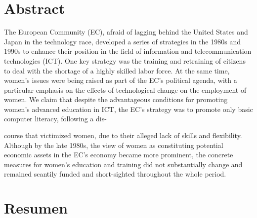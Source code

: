 \documentclass{tufte-handout}
\begin{document}
\begin{titlepage}
\begin{fullwidth}
\end{fullwidth}

\vspace*{1em}


\hypertarget{abstract}{%
\section{Abstract}\label{abstract}}

The European Community (EC), afraid of lagging behind the United States
and Japan in the technology race, developed a series of strategies in
the 1980s and 1990s to enhance their position in the field of
information and telecommunication technologies (ICT). One key strategy
was the training and retraining of citizens to deal with the shortage of
a highly skilled labor force. At the same time, women's issues were
being raised as part of the EC's political agenda, with a particular
emphasis on the effects of technological change on the employment of
women. We claim that despite the advantageous conditions for promoting
women's advanced education in ICT, the EC's strategy was to promote only
basic computer literacy, following a dis-

\enlargethispage{2\baselineskip}

\vspace*{2em}


 \end{titlepage}


\noindent course that victimized women,
due to their alleged lack of skills and flexibility. Although by the
late 1980s, the view of women as
constituting potential economic assets
in the EC's economy became more prominent, the concrete measures for
women's education and training did not substantially change and remained
scantily funded and short-sighted throughout the whole period.


\hypertarget{resumen}{%
\section{Resumen}\label{resumen}}
\end{document}
